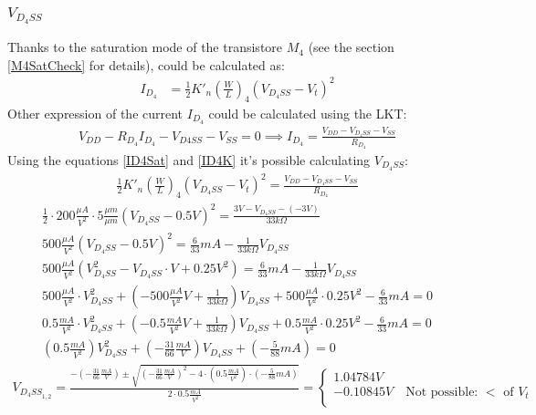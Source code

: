 \documentclass[10pt,a4paper]{book}
\begin{document}
\subsubsection{$V_{D_4SS}$}
Thanks to the saturation mode of the transistore $M_4$ (see the section \ref{M4SatCheck} for details), could be calculated as:\\
\begin{align}
I_{D_4} &= \frac{1}{2}{K'}_n \left(\frac{W}{L}\right)_4 (V_{D_4SS} - V_t)^2 \label{ID4Sat}
\end{align}
Other expression of the current $I_{D_4}$ could be calculated using the LKT:\\
\begin{align}
V_{DD}-R_{D_4}I_{D_4}-V_{D4SS}-V_{SS} = 0 \implies
I_{D_4} = \frac{V_{DD} - V_{D_4SS} - V_{SS}}{R_{D_4}}\label{ID4K}
\end{align}
Using the equations \ref{ID4Sat} and \ref{ID4K} it's possible calculating $V_{D_4SS}$:\\
\begin{align}
\frac{1}{2}{K'}_n \left(\frac{W}{L}\right)_4 (V_{D_4SS} - V_t)^2 = \frac{V_{DD} - V_{D_4SS} - V_{SS}}{R_{D_4}}
\end{align}
\begin{align}
\frac{1}{2}\cdot 200 \frac{\mu A}{V^2} \cdot 5 \frac{\mu m}{\mu m} (V_{D_4SS} - 0.5V)^2 = \frac{3V - V_{D_4SS} - (-3V)}{33k\Omega}\\
500 \frac{\mu A}{V^2} (V_{D_4SS} -0.5V)^2 = \frac{6}{33}mA-\frac{1}{33k\Omega}V_{D_4SS}\\
500 \frac{\mu A}{V^2} (V_{D_4SS}^2- V_{D_4SS}\cdot V +0.25V^2) = \frac{6}{33}mA-\frac{1}{33k\Omega}V_{D_4SS}\\
500 \frac{\mu A}{V^2} \cdot V_{D_4SS}^2 + \left(-500 \frac{\mu A}{V^2}V + \frac{1}{33k\Omega}\right) V_{D_4SS} + 500 \frac{\mu A}{V^2} \cdot 0.25V^2 -\frac{6}{33}mA = 0\\
0.5 \frac{mA}{V^2} \cdot V_{D_4SS}^2 + \left(-0.5 \frac{mA}{V^2}V + \frac{1}{33k\Omega}\right) V_{D_4SS} + 0.5 \frac{mA}{V^2} \cdot 0.25V^2 -\frac{6}{33}mA = 0\\
\left(0.5 \frac{mA}{V^2}\right) V_{D_4SS}^2 + \left( -\frac{31}{66}\frac{mA}{V}\right) V_{D_4SS} + \left(-\frac{5}{88}mA\right) = 0
\end{align}
\begin{align}
V_{{D_{4}SS}_{1,2}} = \frac{-\left( -\frac{31}{66}\frac{mA}{V}\right)\pm \sqrt{\left(-\frac{31}{66}\frac{mA}{V}\right)^2-4\cdot\left(0.5 \frac{mA}{V^2}\right)\cdot\left(-\frac{5}{88}mA\right)}}{2\cdot0.5 \frac{mA}{V^2}} = 
\left\{
\begin{array}{l}
1.04784V \label{VD4SS}\\
-0.10845V \quad \text{Not possible: }<\text{ of } V_t\\
\end{array}
\right. 
\end{align}
\end{document}
